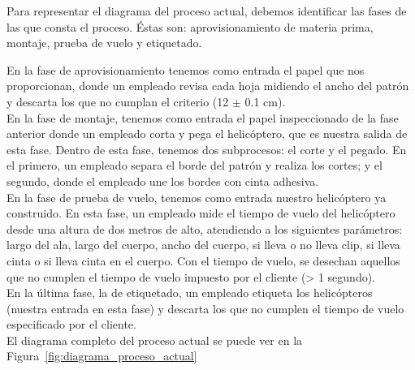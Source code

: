 \documentclass[12pt,a4paper,twoside,openright,titlepage,final]{article}
\begin{document}
Para representar el diagrama del proceso actual, debemos identificar las fases de las que consta el proceso. Éstas son: aprovisionamiento de materia prima, montaje, prueba de vuelo y etiquetado. 

En la fase de aprovisionamiento tenemos como entrada el papel que nos proporcionan, donde un empleado revisa cada hoja midiendo el ancho del patrón y descarta los que no cumplan el criterio (12 $\pm$ 0.1 cm).\\

En la fase de montaje, tenemos como entrada el papel inspeccionado de la fase anterior donde un empleado corta y pega el helicóptero, que es nuestra salida de esta fase. Dentro de esta fase, tenemos dos subprocesos: el corte y el pegado. En el primero, un empleado separa el borde del patrón y realiza los cortes; y el segundo, donde el empleado une los bordes con cinta adhesiva.\\

En la fase de prueba de vuelo, tenemos como entrada nuestro helicóptero ya construido. En esta fase, un empleado mide el tiempo de vuelo del helicóptero desde una altura de dos metros de alto, atendiendo a los siguientes parámetros: largo del ala, largo del cuerpo, ancho del cuerpo, si lleva o no lleva clip, si lleva cinta o si lleva cinta en el cuerpo. Con el tiempo de vuelo, se desechan aquellos que no cumplen el tiempo de vuelo impuesto por el cliente (> 1 segundo).\\

En la última fase, la de etiquetado, un empleado etiqueta los helicópteros (nuestra entrada en esta fase) y descarta los que no cumplen el tiempo de vuelo especificado por el cliente.\\

El diagrama completo del proceso actual se puede ver en la Figura~\ref{fig:diagrama_proceso_actual}\\  
\end{document}
